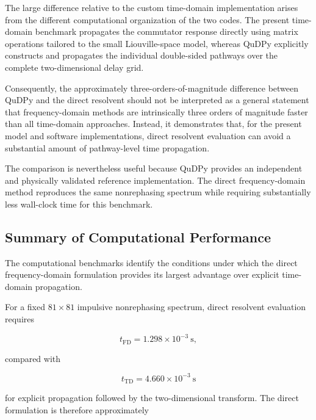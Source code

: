 \documentclass[11pt]{article}
\begin{document}
The large difference relative to the custom time-domain implementation
arises from the different computational organization of the two
codes.  The present time-domain benchmark propagates the commutator
response directly using matrix operations tailored to the small
Liouville-space model, whereas QuDPy explicitly constructs and
propagates the individual double-sided pathways over the complete
two-dimensional delay grid.

Consequently, the approximately three-orders-of-magnitude difference
between QuDPy and the direct resolvent should not be interpreted as a
general statement that frequency-domain methods are intrinsically
three orders of magnitude faster than all time-domain approaches.
Instead, it demonstrates that, for the present model and software
implementations, direct resolvent evaluation can avoid a substantial
amount of pathway-level time propagation.

The comparison is nevertheless useful because QuDPy provides an
independent and physically validated reference implementation.  The
direct frequency-domain method reproduces the same nonrephasing
spectrum while requiring substantially less wall-clock time for this
benchmark.

\subsection{Summary of Computational Performance}
\label{subsec:computational_summary}

The computational benchmarks identify the conditions under which the
direct frequency-domain formulation provides its largest advantage over
explicit time-domain propagation.

For a fixed $81\times81$ impulsive nonrephasing spectrum, direct
resolvent evaluation requires

\begin{equation}
t_{\mathrm{FD}}
=
1.298\times10^{-3}\ \mathrm{s},
\end{equation}

compared with

\begin{equation}
t_{\mathrm{TD}}
=
4.660\times10^{-3}\ \mathrm{s}
\end{equation}

for explicit propagation followed by the two-dimensional transform.
The direct formulation is therefore approximately
\end{document}
